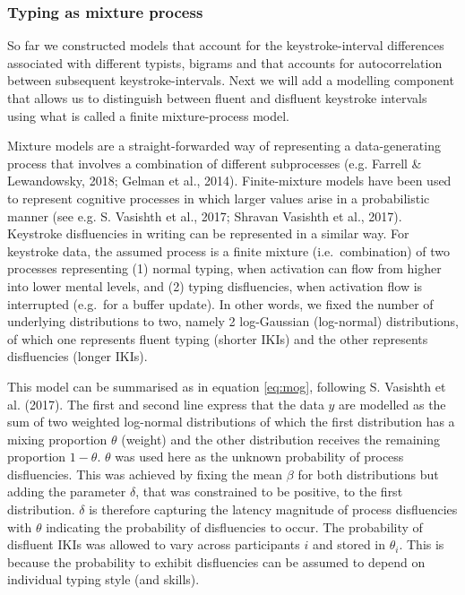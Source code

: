 \documentclass[
  english,
  man,mask,floatsintext]{apa7}
\begin{document}
\hypertarget{typing-as-mixture-process}{%
\subsubsection{Typing as mixture process}\label{typing-as-mixture-process}}

So far we constructed models that account for the keystroke-interval differences associated with different typists, bigrams and that accounts for autocorrelation between subsequent keystroke-intervals. Next we will add a modelling component that allows us to distinguish between fluent and disfluent keystroke intervals using what is called a finite mixture-process model.

Mixture models are a straight-forwarded way of representing a data-generating process that involves a combination of different subprocesses (e.g. Farrell \& Lewandowsky, 2018; Gelman et al., 2014). Finite-mixture models have been used to represent cognitive processes in which larger values arise in a probabilistic manner (see e.g. S. Vasishth et al., 2017; Shravan Vasishth et al., 2017). Keystroke disfluencies in writing can be represented in a similar way. For keystroke data, the assumed process is a finite mixture (i.e.~combination) of two processes representing (1) normal typing, when activation can flow from higher into lower mental levels, and (2) typing disfluencies, when activation flow is interrupted (e.g.~for a buffer update). In other words, we fixed the number of underlying distributions to two, namely 2 log-Gaussian (log-normal) distributions, of which one represents fluent typing (shorter IKIs) and the other represents disfluencies (longer IKIs).

This model can be summarised as in equation \ref{eq:mog}, following S. Vasishth et al. (2017). The first and second line express that the data \(y\) are modelled as the sum of two weighted log-normal distributions of which the first distribution has a mixing proportion \(\theta\) (weight) and the other distribution receives the remaining proportion \(1-\theta\). \(\theta\) was used here as the unknown probability of process disfluencies. This was achieved by fixing the mean \(\beta\) for both distributions but adding the parameter \(\delta\), that was constrained to be positive, to the first distribution. \(\delta\) is therefore capturing the latency magnitude of process disfluencies with \(\theta\) indicating the probability of disfluencies to occur. The probability of disfluent IKIs was allowed to vary across participants \(i\) and stored in \(\theta_i\). This is because the probability to exhibit disfluencies can be assumed to depend on individual typing style (and skills).
\end{document}
